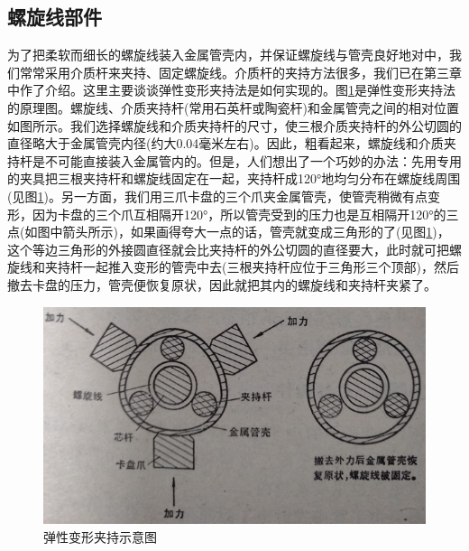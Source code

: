 \subsection{螺旋线部件}
为了把柔软而细长的螺旋线装入金属管壳内，并保证螺旋线与管壳良好地对中，我们常常采用介质杆来夹持、固定螺旋线。介质杆的夹持方法很多，我们已在第三章中作了介绍。这里主要谈谈弹性变形夹持法是如何实现的。图\ref{ch10-10}是弹性变形夹持法的原理图。螺旋线、介质夹持杆(常用石英杆或陶瓷杆)和金属管壳之间的相对位置如图所示。我们选择螺旋线和介质夹持杆的尺寸，使三根介质夹持杆的外公切圆的直径略大于金属管壳内径(约大0.04毫米左右)。因此，粗看起来，螺旋线和介质夹持杆是不可能直接装入金属管内的。但是，人们想出了一个巧妙的办法：先用专用的夹具把三根夹持杆和螺旋线固定在一起，夹持杆成120°地均匀分布在螺旋线周围(见图\ref{ch10-10})。另一方面，我们用三爪卡盘的三个爪夹金属管壳，使管壳稍微有点变形，因为卡盘的三个爪互相隔开120°，所以管壳受到的压力也是互相隔开120°的三点(如图中箭头所示)，如果画得夸大一点的话，管壳就变成三角形的了(见图\ref{ch10-10})，这个等边三角形的外接圆直径就会比夹持杆的外公切圆的直径要大，此时就可把螺旋线和夹持杆一起推入变形的管壳中去(三根夹持杆应位于三角形三个顶部)，然后撤去卡盘的压力，管壳便恢复原状，因此就把其内的螺旋线和夹持杆夹紧了。
\begin{figure}[phtb]
	\centering
	\includegraphics[width=0.73\linewidth]{figure/ch10-10}
	\caption{ 弹性变形夹持示意图}
	\label{ch10-10}
\end{figure}

